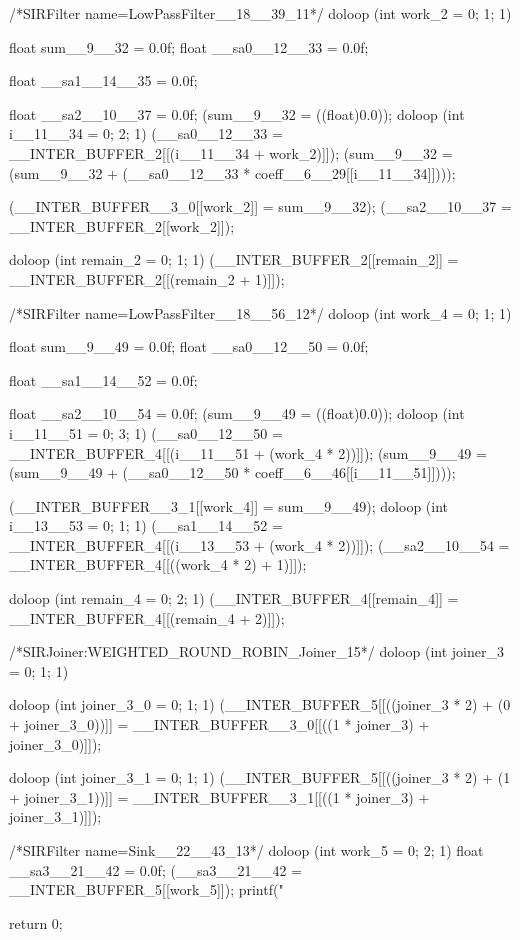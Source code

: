 \documentclass[10pt, letterpaper, onecolumn]{article}
\begin{document}
\begin{verbatimtab}[4]
{{{      }
    
/*SIRFilter name=LowPassFilter__18__39_11*/
    doloop (int work_2 = 0; 1; 1) 
      {
        float sum__9__32 = 0.0f;
        float __sa0__12__33 = 0.0f;

        float __sa1__14__35 = 0.0f;

        float __sa2__10__37 = 0.0f;
        (sum__9__32 = ((float)0.0));
        doloop (int i__11__34 = 0; 2; 1) 
          {
            (__sa0__12__33 =
	     __INTER_BUFFER_2[[(i__11__34 + work_2)]]);
            (sum__9__32 = 
	     (sum__9__32 + (__sa0__12__33 * coeff__6__29[[i__11__34]])));
          }

        (__INTER_BUFFER__3_0[[work_2]] = sum__9__32);
        (__sa2__10__37 = __INTER_BUFFER_2[[work_2]]);
      }

    doloop (int remain_2 = 0; 1; 1) 
      (__INTER_BUFFER_2[[remain_2]] = 
       __INTER_BUFFER_2[[(remain_2 + 1)]]);
    
/*SIRFilter name=LowPassFilter__18__56_12*/
    doloop (int work_4 = 0; 1; 1) 
      {
        float sum__9__49 = 0.0f;
        float __sa0__12__50 = 0.0f;

        float __sa1__14__52 = 0.0f;

        float __sa2__10__54 = 0.0f;
        (sum__9__49 = ((float)0.0));
        doloop (int i__11__51 = 0; 3; 1) 
          {
            (__sa0__12__50 = 
	     __INTER_BUFFER_4[[(i__11__51 + (work_4 * 2))]]);
            (sum__9__49 = 
	     (sum__9__49 + (__sa0__12__50 * coeff__6__46[[i__11__51]])));
          }

        (__INTER_BUFFER__3_1[[work_4]] = sum__9__49);
        doloop (int i__13__53 = 0; 1; 1) {
	  (__sa1__14__52 = 
	   __INTER_BUFFER_4[[(i__13__53 + (work_4 * 2))]]);
	}
        (__sa2__10__54 = __INTER_BUFFER_4[[((work_4 * 2) + 1)]]);
      }

    doloop (int remain_4 = 0; 2; 1) 
      (__INTER_BUFFER_4[[remain_4]] = __INTER_BUFFER_4[[(remain_4 + 2)]]);
    
/*SIRJoiner:WEIGHTED_ROUND_ROBIN_Joiner_15*/
    doloop (int joiner_3 = 0; 1; 1) 
      {
        doloop (int joiner_3_0 = 0; 1; 1) 
          (__INTER_BUFFER_5[[((joiner_3 * 2) + (0 + joiner_3_0))]] = 
	   __INTER_BUFFER__3_0[[((1 * joiner_3) + joiner_3_0)]]);

        doloop (int joiner_3_1 = 0; 1; 1) 
          (__INTER_BUFFER_5[[((joiner_3 * 2) + (1 + joiner_3_1))]] = 
	   __INTER_BUFFER__3_1[[((1 * joiner_3) + joiner_3_1)]]);

      }
    
/*SIRFilter name=Sink__22__43_13*/
    doloop (int work_5 = 0; 2; 1) 
      {
        float __sa3__21__42 = 0.0f;
        (__sa3__21__42 = __INTER_BUFFER_5[[work_5]]);
        printf("%
      }

  }
  return 0;
}

\end{verbatimtab}


{\small


}
\end{document}
